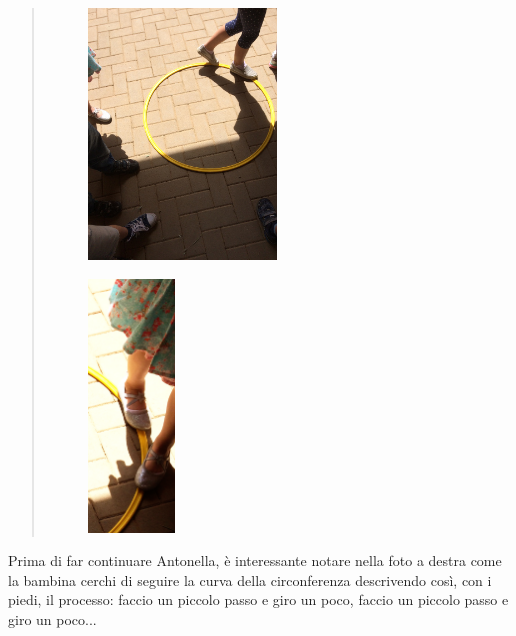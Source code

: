 \begin{quote}
\begin{minipage}{0.4\textwidth}
\begin{figure}[H]
\begin{center}
   \includegraphics[width=5.0cm,trim=4 4 6 4,clip]{./images/cerchio/PiccolomanualeLibreLogo5-img6.jpg}
\end{center}
   \label{cer-7}
\end{figure}
\end{minipage} \hfill
\begin{minipage}{0.4\textwidth}
\begin{figure}[H]
\begin{center}
   \includegraphics[width=2.3cm,trim=4 4 6 4,clip]{./images/cerchio/PiccolomanualeLibreLogo5-img7.jpg}
\end{center}
   \label{cer-8}
\end{figure}
\end{minipage} \hfill

\end{quote}

Prima di far continuare Antonella, è interessante notare nella foto a destra come la bambina cerchi di seguire la curva della circonferenza descrivendo così, con i piedi, il processo: faccio un piccolo passo e giro un poco, faccio un piccolo passo e giro un poco...

